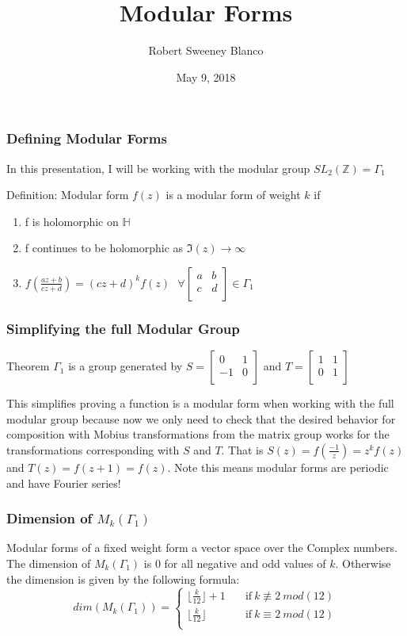 \documentclass{beamer}
\title{Modular Forms}
\author{Robert Sweeney Blanco}
\institute{Advisor: Brandon Williams}
\date{May 9, 2018}
\begin{document}
 
\frame{\titlepage}
 
\begin{frame}
\frametitle{Defining Modular Forms}
In this presentation, I will be working with the modular group $SL_2(\mathbb{Z}) = \Gamma_1$
\begin{block}{Definition: Modular form}
$f(z)$ is a modular form of weight $k$ if 
\begin{enumerate}
\item  f is holomorphic on $\mathbb{H}$\\
\item f continues to be holomorphic as $\Im(z) \longrightarrow \infty$
\item $f(\frac{az+b}{cz+d}) = (cz+d)^k f(z) \  \ \ \forall \begin{bmatrix}
a & b \\
c & d \\
\end{bmatrix} 
\in \Gamma_1$
\end{enumerate}
\end{block}
\end{frame}

\begin{frame}
\frametitle{Simplifying the full Modular Group}
\begin{block}{Theorem}
$\Gamma_1$ is a group generated by $S = \begin{bmatrix}
0 & 1 \\
-1 & 0 \\
\end{bmatrix}$
and $T = \begin{bmatrix}
1 & 1 \\
0 & 1 \\
\end{bmatrix}$
\end{block}
This simplifies proving a function is a modular form when working with the full modular group because now we only need to check that the desired behavior for composition with Mobius transformations from the matrix group works for the transformations corresponding with $S$ and $T$. That is $S(z)=f(\frac{-1}{z}) = z^kf(z)$ and $T(z)=f(z+1)=f(z)$. Note this means modular forms are periodic and have Fourier series!
\end{frame}

\begin{frame}

\frametitle{Dimension of $M_k(\Gamma_1)$}
Modular forms of a fixed weight form a vector space over the Complex numbers. The dimension of $M_k(\Gamma_1)$ is $0$ for all negative and odd values of $k$. Otherwise the dimension is given by the following formula:
\[   
dim(M_k(\Gamma_1)) = 
     \begin{cases}
       \lfloor \frac{k}{12} \rfloor + 1 & \quad \text{if} \  k \not \equiv  2 \ mod(12) \\
       \lfloor \frac{k}{12} \rfloor & \quad \text{if} \  k \equiv  2 \ mod(12) \\
     \end{cases}
\]
\end{frame}
\end{document}
